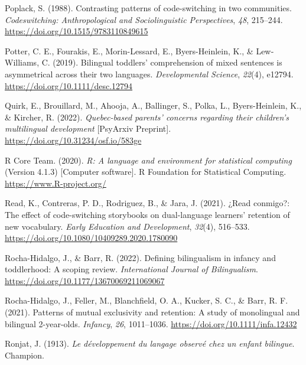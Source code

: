 \documentclass[
  man,floatsintext]{apa7}
\newlength{\cslhangindent}
\newlength{\cslentryspacingunit} %
\newenvironment{CSLReferences}[2] %
 {%
  \setlength{\parindent}{0pt}
  \ifodd #1
  \let\oldpar\par
  \def\par{\hangindent=\cslhangindent\oldpar}
  \fi
  \setlength{\parskip}{#2\cslentryspacingunit}
 }%
 {}
\begin{document}
\begin{CSLReferences}{1}{0}
\leavevmode{}%
Poplack, S. (1988). Contrasting patterns of code-switching in two communities. \emph{Codeswitching: Anthropological and Sociolinguistic Perspectives}, \emph{48}, 215--244. \url{https://doi.org/10.1515/9783110849615}

\leavevmode{}%
Potter, C. E., Fourakis, E., Morin-Lessard, E., Byers-Heinlein, K., \& Lew‐Williams, C. (2019). Bilingual toddlers' comprehension of mixed sentences is asymmetrical across their two languages. \emph{Developmental Science}, \emph{22}(4), e12794. \url{https://doi.org/10.1111/desc.12794}

\leavevmode{}%
Quirk, E., Brouillard, M., Ahooja, A., Ballinger, S., Polka, L., Byers-Heinlein, K., \& Kircher, R. (2022). \emph{Quebec-based parents' concerns regarding their children's multilingual development} {[}PsyArxiv Preprint{]}. \url{https://doi.org/10.31234/osf.io/583ge}

\leavevmode{}%
R Core Team. (2020). \emph{R: A language and environment for statistical computing} (Version 4.1.3) {[}Computer software{]}. R Foundation for Statistical Computing. \url{https://www.R-project.org/}

\leavevmode{}%
Read, K., Contreras, P. D., Rodriguez, B., \& Jara, J. (2021). ¿Read conmigo?: The effect of code-switching storybooks on dual-language learners' retention of new vocabulary. \emph{Early Education and Development}, \emph{32}(4), 516--533. \url{https://doi.org/10.1080/10409289.2020.1780090}

\leavevmode{}%
Rocha-Hidalgo, J., \& Barr, R. (2022). Defining bilingualism in infancy and toddlerhood: A scoping review. \emph{International Journal of Bilingualism}. \url{https://doi.org/10.1177/13670069211069067}

\leavevmode{}%
Rocha-Hidalgo, J., Feller, M., Blanchfield, O. A., Kucker, S. C., \& Barr, R. F. (2021). Patterns of mutual exclusivity and retention: A study of monolingual and bilingual 2-year-olds. \emph{Infancy}, \emph{26}, 1011--1036. \url{https://doi.org/10.1111/infa.12432}

\leavevmode{}%
Ronjat, J. (1913). \emph{Le développement du langage observé chez un enfant bilingue}. Champion.


\end{CSLReferences}
\end{document}

